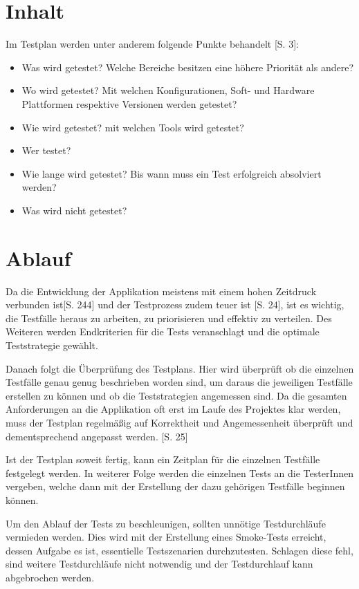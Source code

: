 \documentclass[a4paper,bibtotoc,oneside]{scrbook}
\begin{document}
\section{Inhalt}
Im Testplan werden unter anderem folgende Punkte behandelt \cite{test_auto}[S. 3]:

\begin{itemize}
	\item Was wird getestet? Welche Bereiche besitzen eine höhere Priorität als andere?
	\item Wo wird getestet? Mit welchen Konfigurationen, Soft- und Hardware Plattformen respektive Versionen werden getestet?
	\item Wie wird getestet? mit welchen Tools wird getestet?
	\item Wer testet?
	\item Wie lange wird getestet? Bis wann muss ein Test erfolgreich absolviert werden?
	\item Was wird nicht getestet?
\end{itemize}


\section{Ablauf}
Da die Entwicklung der Applikation meistens mit einem hohen Zeitdruck verbunden ist\cite{software_qual}[S. 244] und der Testprozess zudem teuer ist \cite{eval_regression}[S. 24], ist es wichtig, die Testfälle heraus zu arbeiten, zu priorisieren und effektiv zu verteilen. Des Weiteren werden Endkriterien für die Tests veranschlagt und die optimale Teststrategie gewählt.

Danach folgt die Überprüfung des Testplans. Hier wird überprüft ob die einzelnen Testfälle genau genug beschrieben worden sind, um daraus die jeweiligen Testfälle erstellen zu können und ob die Teststrategien angemessen sind. Da die gesamten Anforderungen an die Applikation oft erst im Laufe des Projektes klar werden, muss der Testplan regelmäßig auf Korrektheit und Angemessenheit überprüft und dementsprechend angepasst werden. \cite{eval_regression}[S. 25] 

Ist der Testplan soweit fertig, kann ein Zeitplan für die einzelnen Testfälle festgelegt werden. In weiterer Folge werden die einzelnen Tests an die TesterInnen vergeben, welche dann mit der Erstellung der dazu gehörigen Testfälle beginnen können.

Um den Ablauf der Tests zu beschleunigen, sollten unnötige Testdurchläufe vermieden werden. Dies wird mit der Erstellung eines Smoke-Tests erreicht, dessen Aufgabe es ist, essentielle Testszenarien durchzutesten. Schlagen diese fehl, sind weitere Testdurchläufe nicht notwendig und der Testdurchlauf kann abgebrochen werden. 
\end{document}
